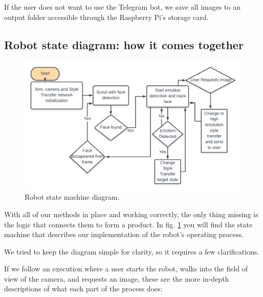 If the user does not want to use the Telegram bot, we save all images to an output folder accessible through the Raspberry Pi's storage card.


\subsection{Robot state diagram: how it comes together}

\begin{figure}[ht]
  \centering
  \includegraphics[width=\textwidth]{resources/state_machine.png}
  \caption{Robot state machine diagram.}\label{fig:state_machine}
\end{figure}

With all of our methods in place and working correctly, the only thing missing is the logic that connects them to form a product. In fig. \ref{fig:state_machine} you will find the state machine that describes our implementation of the robot's operating process. 




We tried to keep the diagram simple for clarity, so it requires a few clarifications.

If we follow an execution where a user starts the robot, walks into the field of view of the camera, and requests an image, these are the more in-depth descriptions of what each part of the process does:

